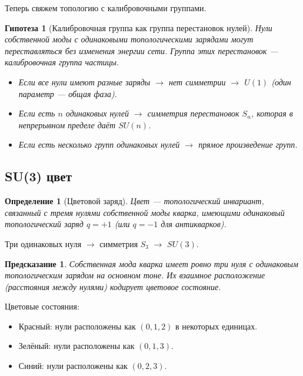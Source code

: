 \documentclass[12pt,a4paper]{article}
\newtheorem{definition}{Определение}[section]
\newtheorem{hypothesis}{Гипотеза}[section]
\newtheorem{prediction}{Предсказание}[section]
\begin{document}
Теперь свяжем топологию с калибровочными группами.

\begin{hypothesis}[Калибровочная группа как группа перестановок нулей]
Нули собственной моды с одинаковыми топологическими зарядами могут переставляться без изменения энергии сети. Группа этих перестановок — калибровочная группа частицы.
\begin{itemize}
    \item Если все нули имеют разные заряды $\to$ нет симметрии $\to$ $U(1)$ (один параметр — общая фаза).
    \item Если есть $n$ одинаковых нулей $\to$ симметрия перестановок $S_n$, которая в непрерывном пределе даёт $SU(n)$.
    \item Если есть несколько групп одинаковых нулей $\to$ прямое произведение групп.
\end{itemize}
\end{hypothesis}

\subsection{SU(3) цвет}

\begin{definition}[Цветовой заряд]
Цвет — топологический инвариант, связанный с тремя нулями собственной моды кварка, имеющими одинаковый топологический заряд $q = +1$ (или $q = -1$ для антикварков).
\end{definition}

Три одинаковых нуля $\to$ симметрия $S_3$ $\to$ $SU(3)$.

\begin{prediction}
Собственная мода кварка имеет ровно три нуля с одинаковым топологическим зарядом на основном тоне. Их взаимное расположение (расстояния между нулями) кодирует цветовое состояние.
\end{prediction}

Цветовые состояния:
\begin{itemize}
    \item Красный: нули расположены как $(0, 1, 2)$ в некоторых единицах.
    \item Зелёный: нули расположены как $(0, 1, 3)$.
    \item Синий: нули расположены как $(0, 2, 3)$.
\end{itemize}
\end{document}
